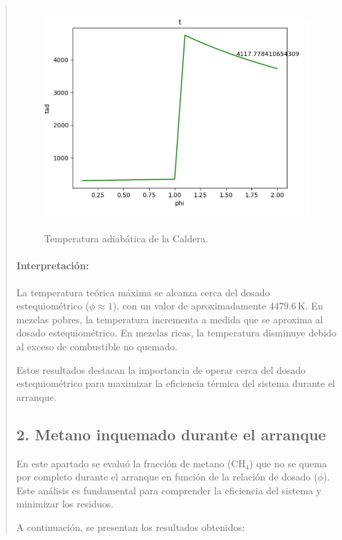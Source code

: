 \documentclass[11pt, a4paper]{article}
\begin{document}
\begin{quote}
\begin{center}
\begin{adjustwidth}{-1.7cm}{-1cm}
\vspace*{1cm}

\begin{figure}[h!]
\centering
 \includegraphics[width=4.486625209424in, height=3.360805199507in]{media/Tad_Caldera.jpg}
\caption{Temperatura adiabática de la Caldera.}
\label{fig:caldera}
\end{figure}

\newpage

\paragraph{Interpretación:}
La temperatura teórica máxima se alcanza cerca del dosado estequiométrico (\(\phi \approx 1\)), con un valor de aproximadamente \(4479.6 \, \text{K}\). En mezclas pobres, la temperatura incrementa a medida que se aproxima al dosado estequiométrico. En mezclas ricas, la temperatura disminuye debido al exceso de combustible no quemado.

Estos resultados destacan la importancia de operar cerca del dosado estequiométrico para maximizar la eficiencia térmica del sistema durante el arranque.


\subsection*{2. Metano inquemado durante el arranque}

En este apartado se evaluó la fracción de metano (\(\text{CH}_4\)) que no se quema por completo durante el arranque en función de la relación de dosado (\(\phi\)). Este análisis es fundamental para comprender la eficiencia del sistema y minimizar los residuos.

A continuación, se presentan los resultados obtenidos:


\end{adjustwidth}
\end{center}
\end{quote}
\end{document}
